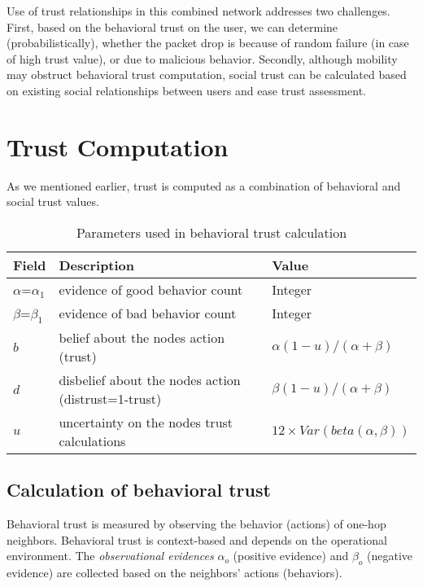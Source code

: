 \documentclass[conference]{IEEEtran}
\begin{document}
Use of trust relationships in this combined network addresses  two challenges. First, based on the behavioral trust on the user, we can determine (probabilistically), whether the packet drop is because of random failure (in case of high trust value), or due to malicious behavior. Secondly, although mobility may obstruct behavioral trust computation, social trust can be calculated based on existing social 	 relationships between users and ease trust assessment.  \section{Trust Computation}
\label{sec:model}
As we mentioned earlier, trust is computed as a combination of behavioral and social trust values.
\begin{table}[t]
\caption{Parameters used in behavioral trust calculation}
\label{message_table_1}
\centering \begin{tabular}{|p{1.5cm}| p{3cm}| p{3cm}|}
    \hline
    \textbf{Field}&\textbf{Description} & \textbf{Value}\\
    \hline
    $\alpha$=$\alpha_1$ & evidence of good behavior count & Integer\\
    \hline
    $\beta$=$\beta_1$ & evidence of bad behavior count & Integer\\
    \hline
    $b$ & belief about the nodes action (trust) & $\alpha(1-u)/(\alpha+\beta)$\\
    \hline
    $d$ & disbelief about the nodes action (distrust=1-trust) & $\beta(1-u)/(\alpha+\beta)$\\
    \hline
     $u$ & uncertainty on the nodes trust calculations & $12\times Var(beta(\alpha, \beta))$\\
    \hline
 \end{tabular}
\end{table}





\subsection{Calculation of behavioral trust}
\label{behave_trust_12}
Behavioral trust is measured by observing the behavior (actions) of one-hop neighbors. Behavioral trust is context-based and depends on the operational environment. The \emph{observational evidences} $\alpha_o$ (positive evidence) and $\beta_o$ (negative evidence) are collected based on the neighbors' actions (behaviors).
\end{document}
